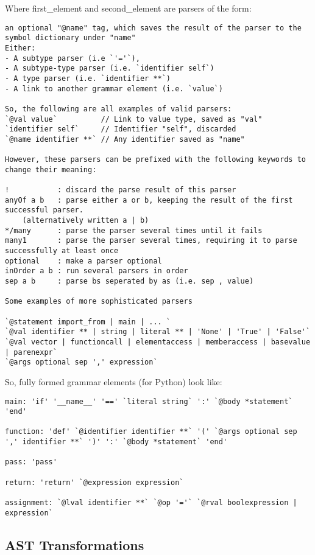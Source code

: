 \documentclass{article}
\begin{document}
Where first\_element and second\_element are parsers of the form:

\begin{verbatim}
an optional "@name" tag, which saves the result of the parser to the symbol dictionary under "name"
Either:
- A subtype parser (i.e `'='`),
- A subtype-type parser (i.e. `identifier self`)
- A type parser (i.e. `identifier **`)
- A link to another grammar element (i.e. `value`)

So, the following are all examples of valid parsers:
`@val value`          // Link to value type, saved as "val"
`identifier self`     // Identifier "self", discarded
`@name identifier **` // Any identifier saved as "name"

However, these parsers can be prefixed with the following keywords to change their meaning:

!           : discard the parse result of this parser
anyOf a b   : parse either a or b, keeping the result of the first successful parser. 
    (alternatively written a | b) 
*/many      : parse the parser several times until it fails
many1       : parse the parser several times, requiring it to parse successfully at least once
optional    : make a parser optional
inOrder a b : run several parsers in order
sep a b     : parse bs seperated by as (i.e. sep , value) 

Some examples of more sophisticated parsers

`@statement import_from | main | ... ` 
`@val identifier ** | string | literal ** | 'None' | 'True' | 'False'`
`@val vector | functioncall | elementaccess | memberaccess | basevalue | parenexpr`
`@args optional sep ',' expression`
\end{verbatim}

So, fully formed grammar elements (for Python) look like:
\begin{verbatim}
main: 'if' '__name__' '==' `literal string` ':' `@body *statement` 'end'

function: 'def' `@identifier identifier **` '(' `@args optional sep ',' identifier **` ')' ':' `@body *statement` 'end' 

pass: 'pass'

return: 'return' `@expression expression`

assignment: `@lval identifier **` `@op '='` `@rval boolexpression | expression`

\end{verbatim}

\subsection{AST Transformations}
\end{document}
